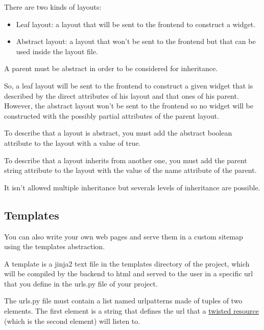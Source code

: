 \documentclass[12pt]{article}
\begin{document}
                There are two kinds of layouts:
                \begin{itemize}
                    \item Leaf layout: a layout that will be sent to the frontend
                          to construct a widget.
                    \item Abstract layout: a layout that won't be sent to the
                          frontend but that can be used inside the layout file.
                \end{itemize}

                A parent must be abstract in order to be considered for
                inheritance.

                So, a leaf layout will be sent to the frontend to construct a
                given widget that is described by the direct attributes of his
                layout and that ones of his parent. However, the abstract layout
                won't be sent to the frontend so no widget will be constructed
                with the possibly partial attributes of the parent layout.

                To describe that a layout is abstract, you must add the abstract
                boolean attribute to the layout with a value of true.

                To describe that a layout inherits from another one, you must
                add the parent string attribute to the layout with the value of
                the name attribute of the parent.

                It isn't allowed multiple inheritance but severals levels of
                inheritance are possible.
            
        \subsection{Templates}
            You can also write your own web pages and serve them in a custom
            sitemap using the templates abstraction.

            A template is a jinja2 text file in the templates directory of the
            project, which will be compiled by the backend to html and served to
            the user in a specific url that you define in the urls.py file of
            your project.

            The urls.py file must contain a list named urlpatterns made of
            tuples of two elements. The first element is a string that defines
            the url that a
            \href{https://twistedmatrix.com/documents/15.0.0/web/howto/using-twistedweb.html#resource-objects}{twisted resource}
            (which is the second element) will listen to.
\end{document}

